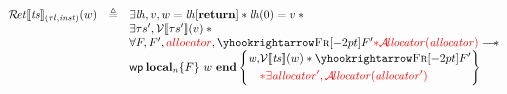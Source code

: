 \documentclass{standalone}
\begin{document}
\flushleft

\[
\begin{array}{rcl}
%
  \Rvalid \llbracket \V{ts} \rrbracket_{(\tau l, \V{inst})}(w) & \triangleq & \exists \V{lh}, v,  w = \V{lh}[\textbf{return}] \ast \V{lh}(0) = v \ast {}
\\
  & & \exists \tau s', \Vvalid\llbracket \tau s' \rrbracket(v) \ast {}
\\
  & & \forall F, F', \rr{allocator}, \frameR{} F' \rr{\ast{} \Avalid(\V{allocator})} \wand
\\
  & & \wprefr{w}{n}{F}{\begin{aligned} \V{w}, &\Vvalid \llbracket \V{ts} \rrbracket(w) \ast{} \frameR{} F' \\ & \rr{\ast{} \exists\V{allocator'}, \Avalid(\V{allocator'})} \end{aligned} }
%
\end{array}
\]
\end{document}
